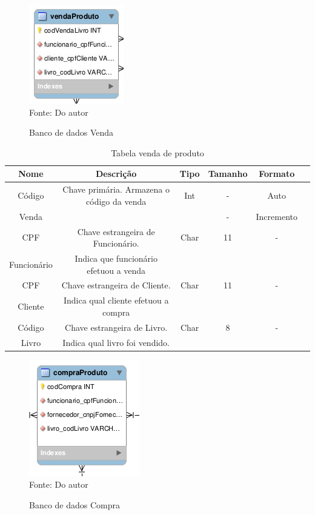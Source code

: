 \begin{figure}[H]
	\centering 
	\caption{Banco de dados Venda}
	\label{banco_de_dados}
	\includegraphics[scale = 0.8]{imagens/bd-venda.jpg}
	\\Fonte: Do autor
\end{figure}

\begin{table}[H]
\caption{Tabela venda de produto}
\begin{center}
\begin{tabular}{|c|c|c|c|c|c|}
\hline
Nome      & Descrição & Tipo & Tamanho & Formato \\ \hline
Código    & Chave primária. Armazena o código da venda & Int & - & Auto \\ 
Venda     &                                            &     & - & Incremento \\ \hline
CPF & Chave estrangeira de Funcionário.      & Char & 11 & - \\ 
Funcionário & Indica que funcionário efetuou a venda &       &    & \\ \hline
CPF  & Chave estrangeira de Cliente.        & Char & 11 & - \\ 
Cliente & Indica qual cliente efetuou a compra &       &    &  \\ \hline
Código  & Chave estrangeira de Livro.    & Char & 8 & - \\ 
Livro & Indica qual livro foi vendido. &       &   & \\ \hline
\end{tabular}
\end{center}
\label{tabela_venda_produto}
\end{table}



\begin{figure}[H]
	\centering 
	\caption{Banco de dados Compra}
	\label{banco_de_dados}
	\includegraphics[scale = 0.8]{imagens/bd-compra.png}
	\\Fonte: Do autor
\end{figure}

